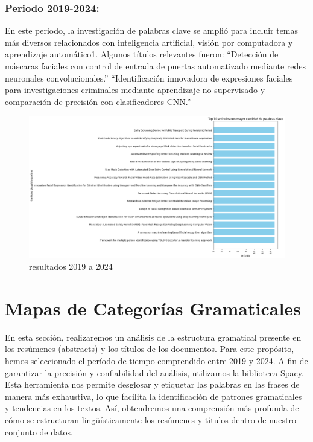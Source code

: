 \documentclass[conference]{IEEEtran}
\begin{document}
\subsubsection{Periodo 2019-2024:}
En este periodo, la investigación de palabras clave se amplió para incluir temas más diversos relacionados con inteligencia artificial, visión por computadora y aprendizaje automático1.
Algunos títulos relevantes fueron:
“Detección de máscaras faciales con control de entrada de puertas automatizado mediante redes neuronales convolucionales.”
“Identificación innovadora de expresiones faciales para investigaciones criminales mediante aprendizaje no supervisado y comparación de precisión con clasificadores CNN.”
\begin{figure}[H]
    \centering
    \includegraphics[width=1\linewidth]{palabrasclavetitulos2019.png}
    \caption{resultados 2019 a 2024}
    \label{fig:enter-label}
\end{figure}
\section{Mapas de Categorías Gramaticales}
En esta sección, realizaremos un análisis de la estructura gramatical presente en los resúmenes (abstracts) y los títulos de los documentos. Para este propósito, hemos seleccionado el período de tiempo comprendido entre 2019 y 2024. A fin de garantizar la precisión y confiabilidad del análisis, utilizamos la biblioteca Spacy. Esta herramienta nos permite desglosar y etiquetar las palabras en las frases de manera más exhaustiva, lo que facilita la identificación de patrones gramaticales y tendencias en los textos. Así, obtendremos una comprensión más profunda de cómo se estructuran lingüísticamente los resúmenes y títulos dentro de nuestro conjunto de datos.
\end{document}
